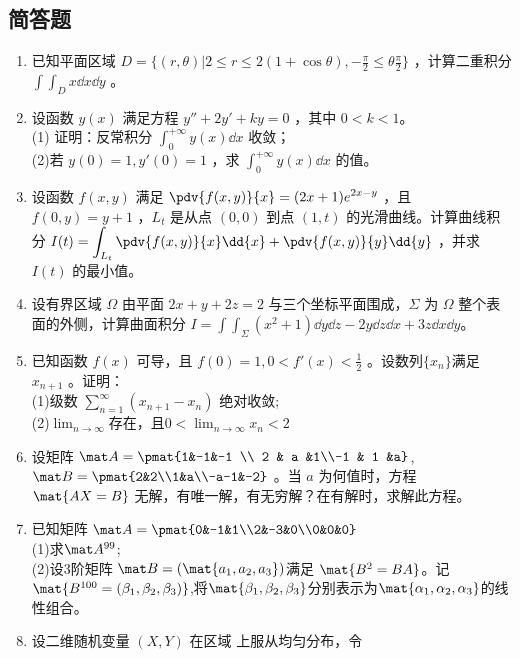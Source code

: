 \subsection{简答题}
\begin{enumerate}
\item 已知平面区域 $\displaystyle D=\{(r,\theta)|2 \le r \le 2(1+\cos \theta),-\frac{\pi}{2} \le \theta \frac{\pi}{2}\}$  ，计算二重积分 $\displaystyle \int\int_D x\dd{x}\dd{y}$ 。
\item 设函数 $y(x)$ 满足方程 $y''+2y'+ky=0$ ，其中 $0<k<1$。\\
(1) 证明：反常积分  $\displaystyle \int_0^{+\infty} y(x)\dd{x}$ 收敛；\\
(2)若 $y(0)=1,y'(0)=1$  ，求 $\displaystyle \int_0^{+\infty} y(x)\dd{x}$ 的值。
\item 设函数 $f(x,y)$ 满足 $\displaystyle \pdv{f(x,y)}{x}=(2x+1)e^{2x-y}$ ，且 $f(0,y)=y+1$  ，$L_t$ 是从点 $(0,0)$ 到点 $(1,t)$ 的光滑曲线。计算曲线积分 $\displaystyle I(t)=\int_{L_t}\pdv{f(x,y)}{x}\dd{x}+\pdv{f(x,y)}{y}\dd{y}$ ，并求 $I(t)$ 的最小值。
\item 设有界区域 $\Omega$ 由平面 $2x+y+2z=2$ 与三个坐标平面围成，$\Sigma$  为 $\Omega$ 整个表面的外侧，计算曲面积分 $\displaystyle I=\int\int_\Sigma (x^2+1)\dd{y}\dd{z}-2y\dd{z}\dd{x}+3z\dd{x}\dd{y}$。
\item 已知函数 $f(x)$ 可导，且 $f(0)=1,0<f'(x)<\frac{1}{2}$ 。设数列$\{{x_n}\}$满足 $x_{n+1}$ 。证明：\\
(1)级数 $\displaystyle \sum_{n=1}^\infty(x_{n+1}-x_n)$ 绝对收敛;\\
(2)$\displaystyle \lim_{n \to \infty}$存在，且$\displaystyle 0<\lim_{n \to \infty}x_n<2$
\item 设矩阵 $\mat A=\pmat{1&-1&-1 \\ 2 & a &1\\-1 & 1 &a}$,$\mat B=\pmat{2&2\\1&a\\-a-1&-2}$  。当 $a$ 为何值时，方程 $\mat{AX=B}$ 无解，有唯一解，有无穷解？在有解时，求解此方程。
\item 已知矩阵 $\mat A=\pmat{0&-1&1\\2&-3&0\\0&0&0}$\\
(1)求$\mat A^{99}$;\\
(2)设3阶矩阵 $\mat B=(\mat{a_1,a_2,a_3})$满足 $\mat {B^2=BA}$。记 $\mat {B^{100}=(\beta_1,\beta_2,\beta_3)}$,将$\mat{\beta_1,\beta_2,\beta_3}$分别表示为$\mat{\alpha_1,\alpha_2,\alpha_3}$的线性组合。
\item 设二维随机变量 $(X,Y)$ 在区域  上服从均匀分布，令
\end{enumerate}
